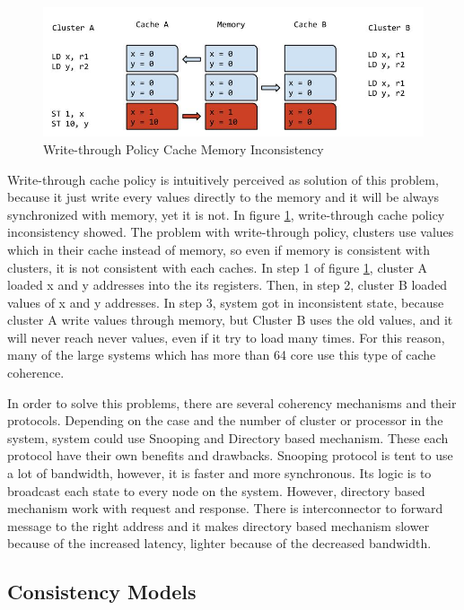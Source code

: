 \documentclass[informationsecurity]{gucmasterproject}
\begin{document}
\begin{figure}[h!]
    \centering
    \includegraphics[width=1\textwidth]{cacheinconsistencywritethrough.jpg}
    \caption{Write-through Policy Cache Memory Inconsistency}
    \label{fig:cacheinconsistencywritethrough}
\end{figure}

Write-through cache policy is intuitively perceived as solution of this problem, because it just write every values directly to the memory and it will be always synchronized with memory, yet it is not. In figure \ref{fig:cacheinconsistencywritethrough}, write-through cache policy inconsistency showed. The problem with write-through policy, clusters use values which in their cache instead of memory, so even if memory is consistent with clusters, it is not consistent with each caches. In step 1 of figure \ref{fig:cacheinconsistencywritethrough}, cluster A loaded x and y addresses into the its registers. Then, in step 2, cluster B loaded  values of x and y addresses. In step 3, system got in inconsistent state, because cluster A write values through memory, but Cluster B uses the old values, and it will never reach never values, even if it try to load many times. For this reason, many of the large systems which has more than 64 core use this type of cache coherence.

In order to solve this problems, there are several coherency mechanisms and their protocols.  Depending on the case and the number of cluster or processor in the system, system could use Snooping and Directory based mechanism. These each protocol have their own benefits and drawbacks. Snooping protocol is tent to use a lot of bandwidth, however, it is faster and more synchronous. Its logic is to broadcast each state to every node on the system. However, directory based mechanism work with request and response. There is interconnector to forward message to the right address and it makes directory based mechanism slower because of the increased latency, lighter because of the decreased bandwidth.

\subsection{Consistency Models}
\end{document}
